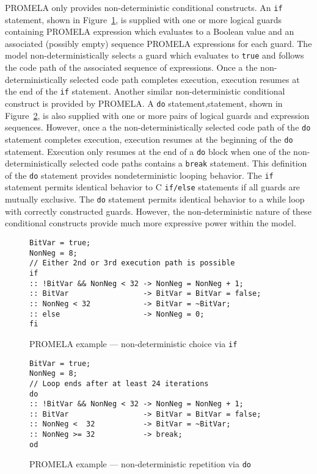 PROMELA only provides non-deterministic conditional constructs.
An \texttt{if} statement, shown in Figure\ \ref{fig:choice}, is supplied with one or more logical guards containing PROMELA expression which evaluates to a Boolean value and an associated (possibly empty) sequence PROMELA expressions for each guard.
The model non-deterministically selects a guard which evaluates to \texttt{true} and follows the code path of the associated sequence of expressions.
Once a the non-deterministically selected code path completes execution, execution resumes at the end of the \texttt{if} statement.
Another similar non-deterministic conditional construct is provided by PROMELA.\@
A \texttt{do} statement,statement, shown in Figure\ \ref{fig:repetition}, is also supplied with one or more pairs of logical guards and expression sequences.
However, once a the non-deterministically selected code path of the \texttt{do} statement completes execution, execution resumes at the beginning of the \texttt{do} statement.
Execution only resumes at the end of a \texttt{do} block when one of the non-deterministically selected code paths contains a \texttt{break} statement.
This definition of the \texttt{do} statement provides nondeterministic looping behavior.
The \texttt{if} statement permits identical behavior to C \texttt{if/else} statements if all guards are mutually exclusive.
The \texttt{do} statement permits identical behavior to a while loop with correctly constructed guards.
However, the non-deterministic nature of these conditional constructs provide much more expressive power within the model.

\begin{figure}
\centering
\caption{\label{fig:choice}PROMELA example --- non-deterministic choice via \texttt{if}}
\begin{verbatim}
BitVar = true;
NonNeg = 8;
// Either 2nd or 3rd execution path is possible
if
:: !BitVar && NonNeg < 32 -> NonNeg = NonNeg + 1;
:: BitVar                 -> BitVar = BitVar = false;
:: NonNeg < 32            -> BitVar = ~BitVar;
:: else                   -> NonNeg = 0;
fi
\end{verbatim}
\end{figure}


\begin{figure}
\centering
\caption{\label{fig:repetition}PROMELA example --- non-deterministic repetition via \texttt{do}}
\begin{verbatim}
BitVar = true;
NonNeg = 8;
// Loop ends after at least 24 iterations
do
:: !BitVar && NonNeg < 32 -> NonNeg = NonNeg + 1;
:: BitVar                 -> BitVar = BitVar = false;
:: NonNeg <  32           -> BitVar = ~BitVar;
:: NonNeg >= 32           -> break;
od
\end{verbatim}
\end{figure}

